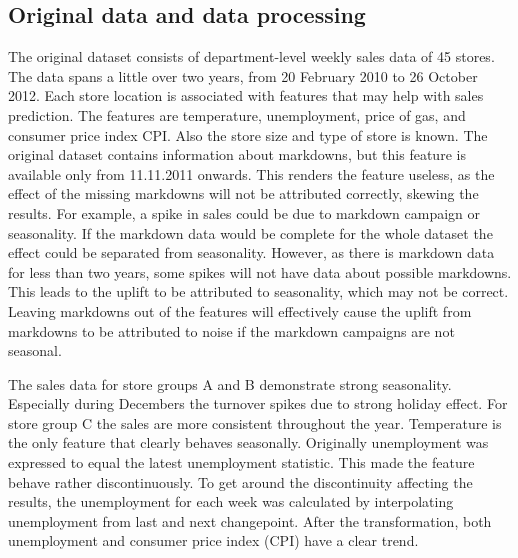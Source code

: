 \documentclass[english, 12pt, a4paper, sci, utf8, a-1b, online]{aaltothesis}
\begin{document}

\subsection{Original data and data processing}

The original dataset consists of department-level weekly sales data of 45 stores. The data spans a little over two years, from 20 February 2010 to 26 October 2012. Each store location is associated with features that may help with sales prediction. The features are temperature, unemployment, price of gas, and consumer price index CPI. Also the store size and type of store is known. The original dataset contains information about markdowns, but this feature is available only from 11.11.2011 onwards. This renders the feature useless, as the effect of the missing markdowns will not be attributed correctly, skewing the results. For example, a spike in sales could be due to markdown campaign or seasonality. If the markdown data would be complete for the whole dataset the effect could be separated from seasonality. However, as there is markdown data for less than two years, some spikes will not have data about possible markdowns. This leads to the uplift to be attributed to seasonality, which may not be correct. Leaving markdowns out of the features will effectively cause the uplift from markdowns to be attributed to noise if the markdown campaigns are not seasonal.

The sales data for store groups A and B demonstrate strong seasonality. Especially during Decembers the turnover spikes due to strong holiday effect. For store group C the sales are more consistent throughout the year. Temperature is the only feature that clearly behaves seasonally. Originally unemployment was expressed to equal the latest unemployment statistic. This made the feature behave rather discontinuously. To get around the discontinuity affecting the results, the unemployment for each week was calculated by interpolating unemployment from last and next changepoint. After the transformation, both unemployment and consumer price index (CPI) have a clear trend. 

\end{document}
